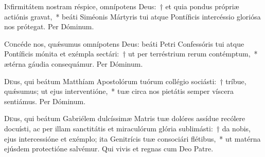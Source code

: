 \documentclass[vesperale_romanum.tex]{subfiles}
\begin{document}
\myrule
\newpage
{}

\oratio

\lettrine{I}{n}firmitátem nostram réspice, omnípotens Deus:~† et quia pondus própriæ actiónis gravat,~* beáti Siméonis Mártyris tui atque Pontíficis intercéssio gloriósa nos prótegat. Per Dóminum.

\myrule


\duplexmajus



\myrule


\duplexmtv


\oratio

\lettrine{C}{o}ncéde nos, quǽsumus omnípotens Deus: beáti Petri Confessóris tui atque Pontíficis mónita et exémpla se\-ctári:~† ut per terréstrium rerum contémptum,~* ætérna gáudia consequámur. Per Dóminum.

\quadcommferiae

\myrule






\oratio

\lettrine{D}{e}us, qui beátum Matthíam Apostolórum tuórum collégio sociásti:~† tríbue, quǽsumus; ut ejus interventióne,~* tuæ circa nos pietátis semper víscera sentiámus.
Per Dóminum.


\quadcommferiae

\myrule


\duplex

\oratio
\lettrine{D}{e}us, qui beátum Gabriélem dulcíssimæ Matris tuæ dolóres assídue recólere docuísti, ac per illam san\-ctitátis et miraculórum glória sublimásti:~† da nobis, ejus intercessióne et exémplo; ita Genitrícis tuæ consociári flétibus,~* ut matérna ejúsdem prote\-ctióne salvémur.
Qui vivis et regnas cum Deo Patre.

\quadcommferiae
\end{document}

